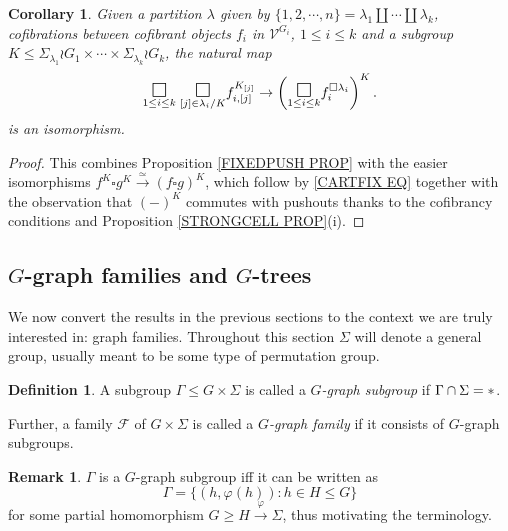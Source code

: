\documentclass[a4paper,10pt
,draft
]{article}%
\numberwithin{equation}{section}
\numberwithin{figure}{section}
\newtheorem{corollary}[equation]{Corollary}%
\theoremstyle{definition} %
\newtheorem{definition}[equation]{Definition}%
\newtheorem{remark}[equation]{Remark}%
\newcommand{\1}{\ensuremath{\mathbbm 1}}%
\begin{document}
\begin{corollary}\label{FIXEDPUSH COR}
	Given a partition $\lambda$ given by
	$\{1,2,\cdots,n\} = \lambda_1 \amalg \cdots \amalg \lambda_k$, cofibrations between cofibrant objects $f_i$ in $\mathcal{V}^{G_i}$, $1\leq i \leq k$ and a subgroup
	$K \leq 
	\Sigma_{\lambda_1} \wr G_1
	\times \cdots \times
	\Sigma_{\lambda_k} \wr G_k
	$,
	the natural map
\[
	\underset{1\leq i\leq k}{\mathlarger{\mathlarger{\square}}}
	\phantom{|}
	\underset{[j] \in \lambda_i/K}{\mathlarger{\mathlarger{\square}}}
	f_{i, [j]}^{K_{[j]}}
\to
	\left( 	\underset{1\leq i\leq k}{\mathlarger{\mathlarger{\square}}}f_i^{\square \lambda_i} \right)^K.
\]
is an isomorphism.
\end{corollary}

\begin{proof}
This combines Proposition \ref{FIXEDPUSH PROP}
with the easier isomorphisms
$f^K \square g^K \xrightarrow{\simeq} 
(f \square g)^K$,
which follow by \eqref{CARTFIX EQ}
together with the observation that $(\minus)^K$
commutes with pushouts thanks to the cofibrancy conditions and Proposition \ref{STRONGCELL PROP}(i).
\end{proof}



\subsection{$G$-graph families and $G$-trees}
\label{G_GRAPH_SECTION}


We now convert the results in the previous sections to the context we are truly interested in:
graph families. 
Throughout this section $\Sigma$ will denote a general group,
usually meant to be some type of permutation group.


\begin{definition}
        \label{GRAPH DEF}
A subgroup $\Gamma \leq G \times \Sigma$ is called a
\textit{$G$-graph subgroup} if $\Gamma \cap \Sigma = \**$. 

Further, a family $\mathcal{F}$ of $G \times \Sigma$ is called a \textit{$G$-graph family} if it consists of $G$-graph subgroups.
\end{definition}

\begin{remark}\label{GRAPH REM}
$\Gamma$ is a $G$-graph subgroup iff it can be written as
\[
	\Gamma = 
	\{
	(h,\varphi(h)) : h \in H \leq G
	\}
\]
for some partial homomorphism $G \geq H \xrightarrow{\varphi} \Sigma$, thus motivating the terminology.
\end{remark}
\end{document}

